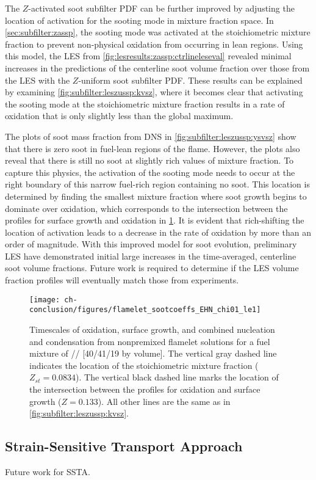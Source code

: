 The $Z$-activated soot subfilter PDF can be further improved by adjusting the location of activation for the sooting mode in mixture fraction space. In \cref{sec:subfilter:zassp}, the sooting mode was activated at the stoichiometric mixture fraction to prevent non-physical oxidation from occurring in lean regions. Using this model, the LES from \cref{fig:lesresults:zassp:ctrlineleseval} revealed minimal increases in the predictions of the centerline soot volume fraction over those from the LES with the $Z$-uniform soot subfilter PDF. These results can be explained by examining \cref{fig:subfilter:leszussp:kvsz}, where it becomes clear that activating the sooting mode at the stoichiometric mixture fraction results in a rate of oxidation that is only slightly less than the global maximum.

The plots of soot mass fraction from DNS in \cref{fig:subfilter:leszussp:ysvsz} show that there is zero soot in fuel-lean regions of the flame. However, the plots also reveal that there is still no soot at slightly rich values of mixture fraction. To capture this physics, the activation of the sooting mode needs to occur at the right boundary of this narrow fuel-rich region containing no soot. This location is determined by finding the smallest mixture fraction where soot growth begins to dominate over oxidation, which corresponds to the intersection between the profiles for surface growth and oxidation in \cref{fig:conclusion:future:zassp:shiftedz}. It is evident that rich-shifting the location of activation leads to a decrease in the rate of oxidation by more than an order of magnitude. With this improved model for soot evolution, preliminary LES have demonstrated initial large increases in the time-averaged, centerline soot volume fractions. Future work is required to determine if the LES volume fraction profiles will eventually match those from experiments.

\begin{figure}[htb]
  \centering
  \texttt{[image: ch-conclusion/figures/flamelet\_sootcoeffs\_EHN\_chi01\_le1]}
  \caption[Shifted Activation of ZASSP]{Timescales of oxidation, surface growth, and combined nucleation and condensation from nonpremixed flamelet solutions for a fuel mixture of // [40/41/19 by volume]. The vertical gray dashed line indicates the location of the stoichiometric mixture fraction ($Z_{st} = 0.0834$). The vertical black dashed line marks the location of the intersection between the profiles for oxidation and surface growth ($Z = 0.133$). All other lines are the same as in \cref{fig:subfilter:leszussp:kvsz}.}
  \label{fig:conclusion:future:zassp:shiftedz}
\end{figure}


\subsection{Strain-Sensitive Transport Approach}
\label{sec:conclusion:future:ssta}

Future work for SSTA.
